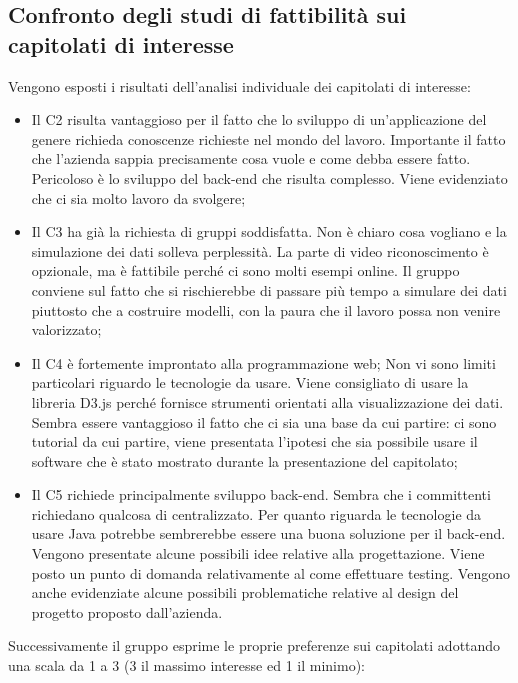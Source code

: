 \documentclass{article}
\begin{document}
\subsection{Confronto degli studi di fattibilità sui capitolati di interesse}%
\label{sub:studi_fattibilita}
Vengono esposti i risultati dell’analisi individuale dei capitolati di interesse:
\begin{itemize}
    \item Il C2 risulta vantaggioso per il fatto che lo sviluppo di un’applicazione del genere richieda conoscenze richieste nel mondo del lavoro. Importante il fatto che l’azienda sappia precisamente cosa vuole e come debba essere fatto. Pericoloso è lo sviluppo del back-end che risulta complesso. Viene evidenziato che ci sia molto lavoro da svolgere;
    \item Il C3 ha già la richiesta di gruppi soddisfatta. Non è chiaro cosa vogliano e la simulazione dei dati solleva perplessità. La parte di video riconoscimento è opzionale, ma è fattibile perché ci sono molti esempi online. Il gruppo conviene sul fatto che si rischierebbe di passare più tempo a simulare dei dati piuttosto che a costruire modelli, con la paura che il lavoro possa non venire valorizzato;
    \item Il C4 è fortemente improntato alla programmazione web; Non vi sono limiti particolari riguardo le tecnologie da usare. Viene consigliato di usare la libreria D3.js perché fornisce strumenti orientati alla visualizzazione dei dati. Sembra essere vantaggioso il fatto che ci sia una base da cui partire: ci sono tutorial da cui partire, viene presentata l’ipotesi che sia possibile usare il software che è stato mostrato durante la presentazione del capitolato;
    \item Il C5 richiede principalmente sviluppo back-end. Sembra che i committenti richiedano qualcosa di centralizzato. Per quanto riguarda le tecnologie da usare Java potrebbe sembrerebbe essere una buona soluzione per il back-end. Vengono presentate alcune possibili idee relative alla progettazione. Viene posto un punto di domanda relativamente al come effettuare testing. Vengono anche evidenziate alcune possibili problematiche relative al design del progetto proposto dall’azienda.
\end{itemize}

\setlength{\parindent}{0pt}Successivamente il gruppo esprime le proprie preferenze sui capitolati adottando una scala da 1 a 3 (3 il massimo interesse ed 1 il minimo):
\end{document}

